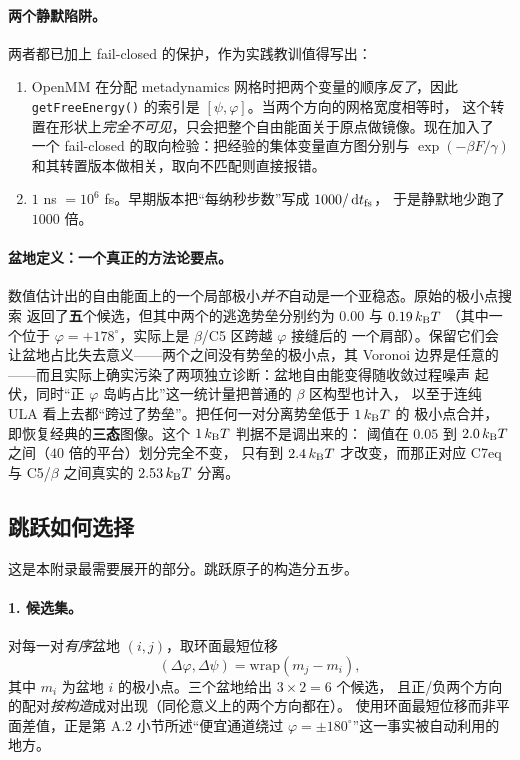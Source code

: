 \documentclass[11pt,a4paper]{article}
\newcommand{\dd}{\,\mathrm{d}}
\begin{document}
\paragraph{两个静默陷阱。}
两者都已加上 fail-closed 的保护，作为实践教训值得写出：
\begin{enumerate}
 \item OpenMM 在分配 metadynamics 网格时把两个变量的顺序\emph{反了}，因此
 \texttt{getFreeEnergy()} 的索引是 $[\psi,\varphi]$。当两个方向的网格宽度相等时，
 这个转置在形状上\emph{完全不可见}，只会把整个自由能面关于原点做镜像。现在加入了
 一个 fail-closed 的取向检验：把经验的集体变量直方图分别与 $\exp(-\beta F/\gamma)$
 和其转置版本做相关，取向不匹配则直接报错。
 \item $1$ ns $=10^{6}$ fs。早期版本把“每纳秒步数”写成 $1000/\dd t_{\rm fs}$，
 于是静默地少跑了 $1000$ 倍。
\end{enumerate}

\paragraph{盆地定义：一个真正的方法论要点。}
数值估计出的自由能面上的一个局部极小\emph{并不}自动是一个亚稳态。原始的极小点搜索
返回了\textbf{五}个候选，但其中两个的逃逸势垒分别约为 $0.00$ 与 $0.19\,k_{\rm B}T$
（其中一个位于 $\varphi=+178^\circ$，实际上是 $\beta$/C5 区跨越 $\varphi$ 接缝后的
一个肩部）。保留它们会让盆地占比失去意义——两个之间没有势垒的极小点，其 Voronoi
边界是任意的——而且实际上确实污染了两项独立诊断：盆地自由能变得随收敛过程噪声
起伏，同时“正 $\varphi$ 岛屿占比”这一统计量把普通的 $\beta$ 区构型也计入，
以至于连纯 ULA 看上去都“跨过了势垒”。把任何一对分离势垒低于 $1\,k_{\rm B}T$ 的
极小点合并，即恢复经典的\textbf{三态}图像。这个 $1\,k_{\rm B}T$ 判据不是调出来的：
阈值在 $0.05$ 到 $2.0\,k_{\rm B}T$ 之间（$40$ 倍的平台）划分完全不变，
只有到 $2.4\,k_{\rm B}T$ 才改变，而那正对应 C7eq 与 C5/$\beta$ 之间真实的
$2.53\,k_{\rm B}T$ 分离。

\subsection{跳跃如何选择}

这是本附录最需要展开的部分。跳跃原子的构造分五步。

\paragraph{1. 候选集。}
对每一对\emph{有序}盆地 $(i,j)$，取环面最短位移
\begin{equation}
 (\Delta\varphi,\Delta\psi)=\mathrm{wrap}\!\left(m_j-m_i\right),
\end{equation}
其中 $m_i$ 为盆地 $i$ 的极小点。三个盆地给出 $3\times2=6$ 个候选，
且正/负两个方向的配对\emph{按构造}成对出现（同伦意义上的两个方向都在）。
使用环面最短位移而非平面差值，正是第 A.2 小节所述“便宜通道绕过
$\varphi=\pm180^\circ$”这一事实被自动利用的地方。
\end{document}
